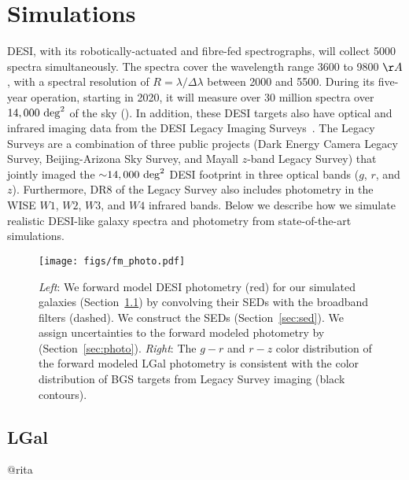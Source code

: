 \section{Simulations}\label{sec:sims}
DESI, with its robotically-actuated and fibre-fed spectrographs, will collect 5000 spectra simultaneously. The spectra
cover the wavelength range 3600 to 9800 $\AA$, with a spectral resolution of $R
= \lambda/\Delta \lambda$ between 2000 and 5500.
During its five-year operation, starting in 2020, it will measure over 30
million spectra over $14,000~{\rm deg}^2$ of the sky (). 
In addition, these DESI targets also have optical and infrared imaging data 
from the DESI Legacy Imaging Surveys~\citep[hereafter Legacy Surveys][]{dey2019}.
The Legacy Surveys are a combination of three public projects 
(Dark Energy Camera Legacy Survey, Beijing-Arizona Sky Survey, and Mayall 
$z$-band Legacy Survey) that jointly imaged the ${\sim}14,000~{\rm deg}^2$ DESI 
footprint in three optical bands ($g$, $r$, and $z$). Furthermore, DR8 of the
Legacy Survey also includes photometry in the WISE $W1$, $W2$, $W3$, and $W4$ 
infrared bands. 
Below we describe how we simulate realistic DESI-like galaxy spectra and photometry 
from state-of-the-art simulations.  


\begin{figure}
\begin{center}
\texttt{[image: figs/fm\_photo.pdf]}
\caption{{\em Left}: We forward model DESI photometry (red) for our simulated
    galaxies (Section~\ref{sec:lgal}) by convolving their SEDs with the
    broadband filters (dashed).  We construct the SEDs  (Section~\ref{sec:sed}).  We assign
    uncertainties to the forward modeled photometry by  (Section~\ref{sec:photo}).
    {\em Right}: The $g-r$ and $r-z$ color distribution of the forward modeled
    {\sc LGal} photometry is consistent with the color distribution of BGS
    targets from Legacy Survey imaging (black contours).} \label{fig:photo}
\end{center}
\end{figure}

\subsection{LGal} \label{sec:lgal}
@rita

